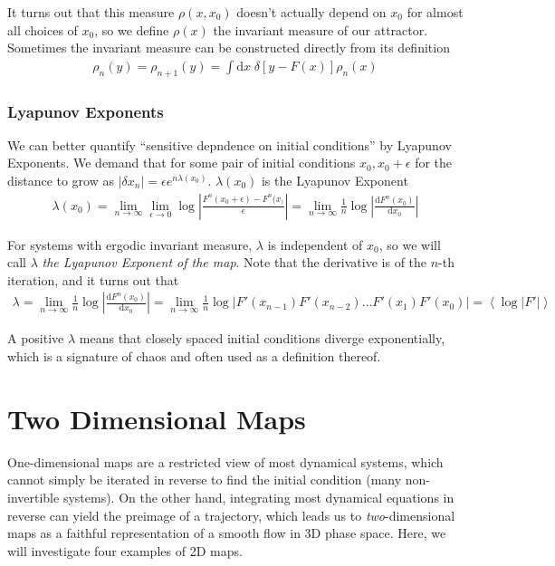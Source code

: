 \documentclass[12pt]{article}
\newcommand{\rd}[2]{\frac{\mathrm{d}#1}{\mathrm{d}#2}}
\newcommand{\abs}[1]{\left|#1\right|}
\newcommand{\expvalue}[1]{\left<#1\right>}
\begin{document}
It turns out that this measure $\rho(x,x_0)$ doesn't actually depend on $x_0$
for almost all choices of $x_0$, so we define $\rho(x)$ the invariant measure of
our attractor. Sometimes the invariant measure can be constructed directly from
its definition
\begin{align}
    \rho_n(y) = \rho_{n+1}(y) = \int \mathrm{d}x\; \delta \left[ y - F(x)
    \right]\rho_n(x)
\end{align}

\subsubsection{Lyapunov Exponents}

We can better quantify ``sensitive depndence on initial conditions'' by Lyapunov
Exponents. We demand that for some pair of initial conditions $x_0, x_0 +
\epsilon$ for the distance to grow as $\abs{\delta x_n} = \epsilon
e^{n\lambda(x_0)}$. $\lambda(x_0)$ is the Lyapunov Exponent
\begin{align}
    \lambda(x_0) = \lim_{n \to \infty}\lim_{\epsilon \to
    0}\log\abs{\frac{F^n(x_0 + \epsilon) - F^n(x_)}{\epsilon}} = \lim_{n \to
    \infty}\frac{1}{n}\log \abs{\rd{F^n(x_0)}{x_0}}
\end{align}

For systems with ergodic invariant measure, $\lambda$ is independent of $x_0$,
so we will call $\lambda$ \emph{the Lyapunov Exponent of the map}. Note that the
derivative is of the $n$-th iteration, and it turns out that
\begin{align}
    \lambda = \lim_{n \to \infty}\frac{1}{n}\log\abs{\rd{F^n(x_0)}{x_0}} =
    \lim_{n \to \infty}\frac{1}{n}\log \abs{F'(x_{n-1})F'(x_{n - 2})\dots
    F'(x_1) F'(x_0)} = \expvalue{\log\abs{F'}}
\end{align}

A positive $\lambda$ means that closely spaced initial conditions diverge
exponentially, which is a signature of chaos and often used as a definition
thereof.

\clearpage

\section{Two Dimensional Maps}

One-dimensional maps are a restricted view of most dynamical systems, which
cannot simply be iterated in reverse to find the initial condition (many
non-invertible systems). On the other hand, integrating most dynamical equations
in reverse can yield the preimage of a trajectory, which leads us to
\emph{two}-dimensional maps as a faithful representation of a smooth flow in 3D
phase space. Here, we will investigate four examples of 2D maps.
\end{document}
